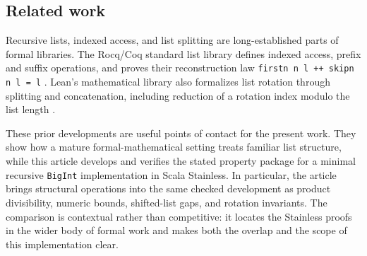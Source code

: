 \subsection*{Related work}

Recursive lists, indexed access, and list splitting are long-established
parts of formal libraries. The Rocq/Coq standard list library defines
indexed access, prefix and suffix operations, and proves their
reconstruction law \texttt{firstn n l ++ skipn n l = l}
\cite{rocq2024liststdlib}. Lean's mathematical library also formalizes
list rotation through splitting and concatenation, including reduction of
a rotation index modulo the list length \cite{leanmathlibrotate}.

These prior developments are useful points of contact for the present
work. They show how a mature formal-mathematical setting treats familiar
list structure, while this article develops and verifies the stated
property package for a minimal recursive \texttt{BigInt} implementation
in Scala Stainless. In particular, the article brings structural
operations into the same checked development as product divisibility,
numeric bounds, shifted-list gaps, and rotation invariants. The comparison
is contextual rather than competitive: it locates the Stainless proofs in
the wider body of formal work and makes both the overlap and the scope of
this implementation clear.
